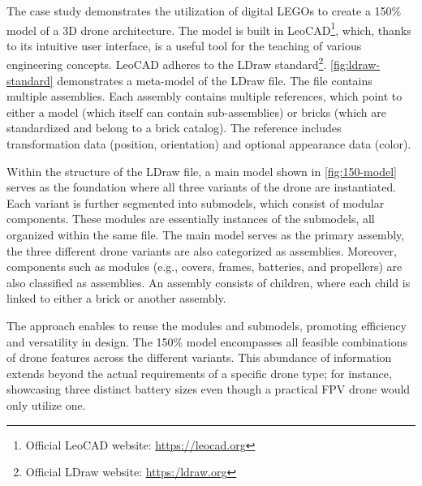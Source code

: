 \documentclass[sigconf,review,anonymous]{acmart}
\begin{document}
The case study demonstrates the utilization of digital LEGOs to create a 150\% model of a 3D drone architecture. 
The model is built in LeoCAD\footnote{Official LeoCAD website: \url{https://leocad.org}}, which, thanks to its intuitive user interface, is a useful tool for the teaching of various engineering concepts. 
LeoCAD adheres to the LDraw standard\footnote{Official LDraw website: \url{https:/ldraw.org}}. 
\cref{fig:ldraw-standard} demonstrates a meta-model of the LDraw file. The file contains multiple assemblies. 
Each assembly contains multiple references, which point to either a model (which itself can contain sub-assemblies) or bricks (which are standardized and belong to a brick catalog). 
The reference includes transformation data (position, orientation) and optional appearance data (color).

Within the structure of the LDraw file, a main model shown in \cref{fig:150-model} serves as the foundation where all three variants of the drone are instantiated. 
Each variant is further segmented into submodels, which consist of modular components. 
These modules are essentially instances of the submodels, all organized within the same file.
The main model serves as the primary assembly, the three different drone variants are also categorized as assemblies. 
Moreover, components such as modules (e.g., covers, frames, batteries, and propellers) are also classified as assemblies. 
An assembly consists of children, where each child is linked to either a brick or another assembly. 


The approach enables to reuse the modules and submodels, promoting efficiency and versatility in design. 
The 150\% model encompasses all feasible combinations of drone features across the different variants. 
This abundance of information extends beyond the actual requirements of a specific drone type; for instance, showcasing three distinct battery sizes even though a practical FPV drone would only utilize one.

\end{document}

